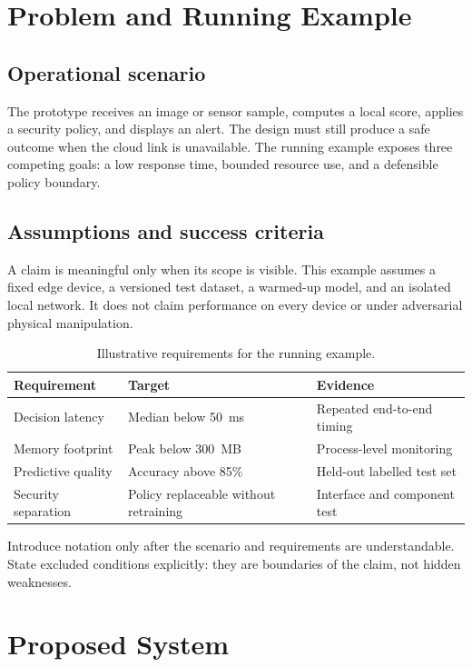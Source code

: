 \chapter{Problem and Running Example}\label{ch:b-problem}
\section{Operational scenario}
The prototype receives an image or sensor sample, computes a local score, applies a security policy, and displays an alert. The design must still produce a safe outcome when the cloud link is unavailable. The running example exposes three competing goals: a low response time, bounded resource use, and a defensible policy boundary.

\section{Assumptions and success criteria}
A claim is meaningful only when its scope is visible. This example assumes a fixed edge device, a versioned test dataset, a warmed-up model, and an isolated local network. It does not claim performance on every device or under adversarial physical manipulation.

\begin{table}[htbp]
\centering
\caption{Illustrative requirements for the running example.}
\label{tab:b-requirements}
\begin{tabularx}{0.9\textwidth}{YYY}
\toprule
Requirement & Target & Evidence\\
\midrule
Decision latency & Median below 50~ms & Repeated end-to-end timing\\
Memory footprint & Peak below 300~MB & Process-level monitoring\\
Predictive quality & Accuracy above 85\% & Held-out labelled test set\\
Security separation & Policy replaceable without retraining & Interface and component test\\
\bottomrule
\end{tabularx}
\end{table}

\begin{keypoint}
Introduce notation only after the scenario and requirements are understandable. State excluded conditions explicitly: they are boundaries of the claim, not hidden weaknesses.
\end{keypoint}

\chapter{Proposed System}\label{ch:b-design}
